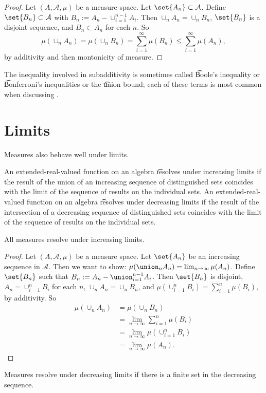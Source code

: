 \begin{proof}Let $(A, \mathcal{A} , \mu )$ be a measure space.
Let $\set{A_n} \subset \mathcal{A} $.
Define $\set{B_n} \subset \mathcal{A} $ with $B_n := A_n - \cup_{i = 1}^{n-1} A_i$.
Then $\cup_n A_n = \cup_n B_n$, $\set{B_n}$ is a disjoint sequence, and $B_n \subset A_n$ for each $n$.
So
\[
\mu (\cup_{n} A_n) = \mu (\cup_{n} B_n) = \sum_{i = 1}^{\infty} \mu (B_n) \leq \sum_{i = 1}^{\infty} \mu (A_n),
\]
by additivity and then montonicity of measure.
\end{proof}
The inequality involved in subadditivity is sometimes called \t{Boole's inequality} or \t{Bonferroni's inequalities} or the \t{union bound}; each of these terms is most common when discussing .

\section*{Limits}

Measures also behave well under limits.

An extended-real-valued function on an algebra \t{resolves under increasing limits} if the result of the union of an increasing sequence of distinguished sets coincides with the limit of the sequence of results on the individual sets.
An extended-real-valued function on an algebra \t{resolves under decreasing limits} if the result of the intersection of a decreasing sequence of distinguished sets coincides with the limit of the sequence of results on the individual sets.

\begin{proposition}
All measures resolve under increasing limits.
\end{proposition}

\begin{proof}Let $(A, \mathcal{A} , \mu )$ be a measure space.
Let $\set{A_n}$ be an increasing sequence in $\mathcal{A} $.
Then we want to show:
$\mu (\union_{n} A_n) = \lim_{n \to \infty} \mu (A_n)$.
Define $\set{B_n}$ such that
$B_n := A_n - \union_{i = 1}^{n-1} A_i$.
Then $\set{B_n}$ is disjoint, $A_n = \cup_{i = 1}^{n} B_i$ for each $n$, $\cup_n A_n = \cup_n B_n$, and $\mu (\cup_{i = 1}^{n} B_i) = \sum_{i = 1}^{n} \mu (B_i)$, by additivity.
So
\[
\begin{aligned}
\mu (\cup_n A_n)
&= \mu (\cup_n B_n) \\
&= \lim_{n \to \infty} \sum_{i = 1}^{n} \mu (B_i) \\
&= \lim_{n \to \infty} \mu (\cup_{i = 1}^{n} B_i) \\
&= \lim_{n \to \infty} \mu (A_n).
\end{aligned}
\]
\end{proof}
\begin{proposition}
Measures resolve under decreasing
limits if there is a finite set in
the decreasing sequence.
\end{proposition}

